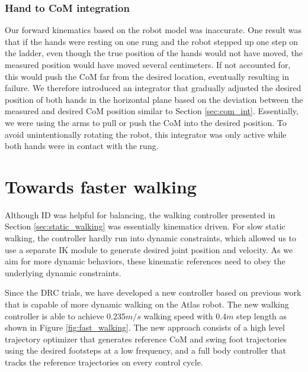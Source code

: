 \documentclass{ws-ijhr}
\newcommand{\fref}[1] {Figure \ref{#1}}
\newcommand{\sref}[1] {Section \ref{#1}}
\begin{document}
\subsubsection{Hand to CoM integration}
Our forward kinematics based on the robot model was inaccurate. 
One result was that if the hands were resting on one rung and the robot stepped
up one step on the ladder, even though the true position of the hands would not
have moved, the measured position would have moved several centimeters. 
If not accounted for, this would push the CoM far from the desired location, 
eventually resulting in failure. 
We therefore introduced an integrator that gradually adjusted the desired position
of both hands in the horizontal plane based on the deviation between the measured 
and desired CoM position similar to \sref{sec:com_int}. 
Essentially, we were using the arms to pull or push the CoM into the desired 
position. 
To avoid unintentionally rotating the robot, this integrator was only active 
while both hands were in contact with the rung. 

\section{Towards faster walking}
\label{sec:new_stuff}
Although ID was helpful for balancing, the walking controller presented in 
\sref{sec:static_walking} was essentially kinematics driven. 
For slow static walking, the controller hardly run into dynamic constraints, 
which allowed us to use a separate IK module to generate desired joint 
position and velocity. 
As we aim for more dynamic behaviors, these kinematic references need to obey
the underlying dynamic constraints. 

Since the DRC trials, we have developed a new controller based on previous 
work that is capable of more dynamic walking on the Atlas robot. 
The new walking controller is able to achieve 0.235$m/s$ walking speed 
with 0.4$m$ step length as shown in \fref{fig:fast_walking}. 
The new approach consists of a high level trajectory optimizer that generates
reference CoM and swing foot trajectories using the desired footsteps at a low
frequency, and a full body controller that tracks the reference trajectories 
on every control cycle. 
\end{document}
